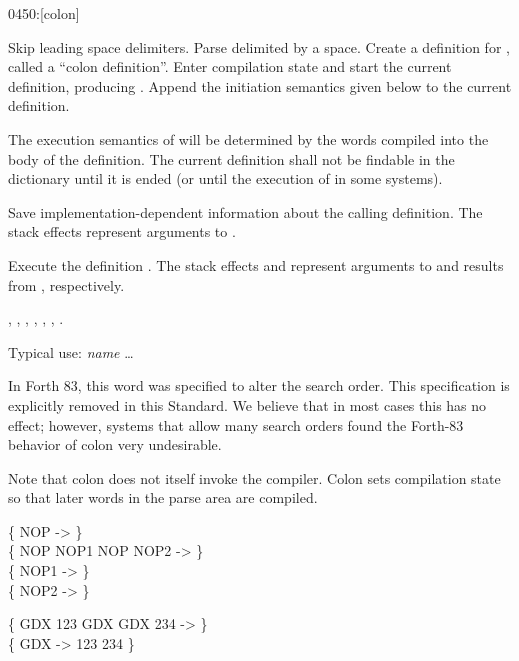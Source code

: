\begin{worddef}{0450}{:}[colon]
\item {}

	Skip leading space delimiters. Parse  delimited by a
	space. Create a definition for , called a ``colon
	definition''. Enter compilation state and start the current
	definition, producing . Append the initiation
	semantics given below to the current definition.

	The execution semantics of  will be determined by the
	words compiled into the body of the definition. The current
	definition shall not be findable in the dictionary until it is
	ended (or until the execution of  in some systems).

\init {}

	Save implementation-dependent information 
	about the calling definition. The stack effects 
	represent arguments to .

\execute[name]

	Execute the definition . The stack effects
	 and  represent arguments to and
	results from , respectively.

\see {},
	,
	,
	,
	\wref{core:[}{[},
	\wref{core:]}{]},
	.

	\begin{defer}
	\rationale %
		Typical use:
			\word{:} \emph{name} {\ldots} \word{;}

		In Forth 83, this word was specified to alter the search order.
		This specification is explicitly removed in this Standard. We
		believe that in most cases this has no effect; however, systems
		that allow many search orders found the Forth-83 behavior of
		colon very undesirable.

		Note that colon does not itself invoke the compiler. Colon sets
		compilation state so that later words in the parse area are
		compiled.

	\testing
		\{ \word{:} NOP \word{:}  \word{;} \word{;} -> \} \\
		\{ NOP NOP1		NOP NOP2 -> \} \\
		\{ 					NOP1 -> \} \\
		\{ 					NOP2 -> \}


		\{ \word{:} GDX   123 \word{;} \tab \word{:} GDX   GDX 234 \word{;} -> \} \\
		\{ GDX -> 123 234 \}
	\end{defer}
\end{worddef}


